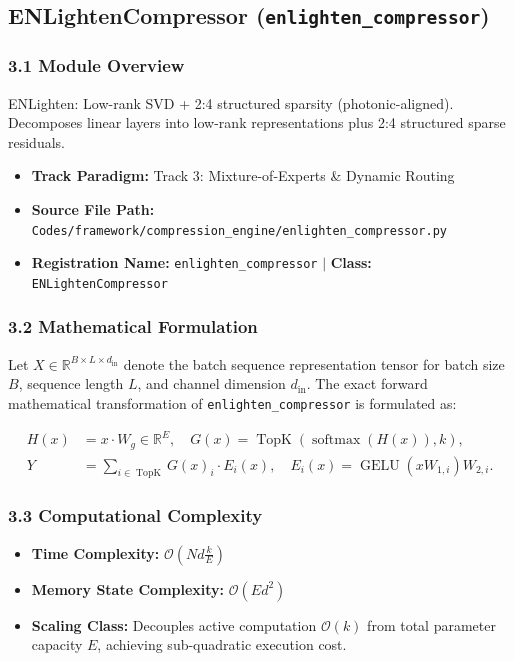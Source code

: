 \subsection{ENLightenCompressor (\texttt{enlighten\_compressor})}
\label{sec:app_module_enlighten\_compressor}

\subsubsection*{3.1 Module Overview}
ENLighten: Low-rank SVD + 2:4 structured sparsity (photonic-aligned). Decomposes linear layers into low-rank representations plus 2:4 structured sparse residuals.
\begin{itemize}
    \item \textbf{Track Paradigm:} Track 3: Mixture-of-Experts & Dynamic Routing
    \item \textbf{Source File Path:} \texttt{Codes/framework/compression\_engine/enlighten\_compressor.py}
    \item \textbf{Registration Name:} \texttt{enlighten\_compressor} $\mid$ \textbf{Class:} \texttt{ENLightenCompressor}
\end{itemize}

\subsubsection*{3.2 Mathematical Formulation}
Let $X \in \mathbb{R}^{B \times L \times d_{\text{in}}}$ denote the batch sequence representation tensor for batch size $B$, sequence length $L$, and channel dimension $d_{\text{in}}$. The exact forward mathematical transformation of \texttt{enlighten\_compressor} is formulated as:

\begin{align}
H(x) &= x \cdot W_g \in \mathbb{R}^{E}, \quad G(x) = \operatorname{TopK}\left(\operatorname{softmax}(H(x)), k\right), \\
Y &= \sum_{i \in \operatorname{TopK}} G(x)_i \cdot E_i(x), \quad E_i(x) = \operatorname{GELU}(x W_{1, i}) W_{2, i}.
\end{align}


\subsubsection*{3.3 Computational Complexity}
\begin{itemize}
    \item \textbf{Time Complexity:} $\mathcal{O}(N d \frac{k}{E})$
    \item \textbf{Memory State Complexity:} $\mathcal{O}(E d^2)$
    \item \textbf{Scaling Class:} Decouples active computation $\mathcal{O}(k)$ from total parameter capacity $E$, achieving sub-quadratic execution cost.
\end{itemize}

